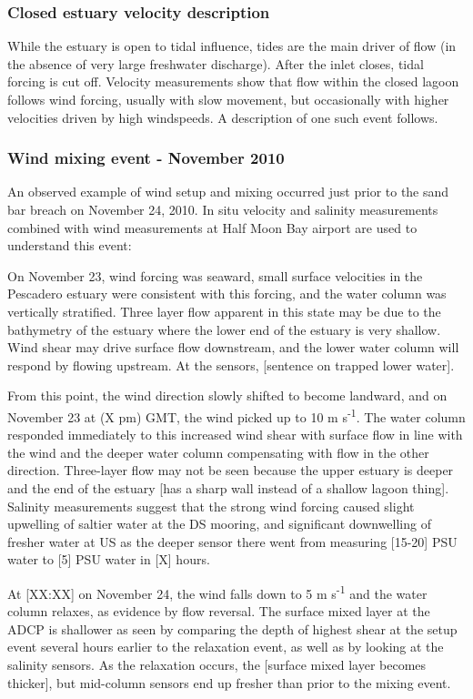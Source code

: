 \subsubsection{Closed estuary velocity description} \label{cl_vel}
While the estuary is open to tidal influence, tides are the main driver of flow (in the absence of very large freshwater discharge). After the inlet closes, tidal forcing is cut off. Velocity measurements show that flow within the closed lagoon follows wind forcing, usually with slow movement, but occasionally with higher velocities driven by high windspeeds. A description of one such event follows.


\subsubsection{Wind mixing event - November 2010} \label{sssec:WindMixNov10}
An observed example of wind setup and mixing occurred just prior to the
sand bar breach on November 24, 2010. In situ velocity and salinity
measurements combined with wind measurements at Half Moon Bay airport
are used to understand this event:

On November 23, wind forcing was seaward, small surface velocities in
the Pescadero estuary were consistent with this forcing, and the water
column was vertically stratified. Three layer flow apparent in this
state may be due to the bathymetry of the estuary where the lower end of
the estuary is very shallow. Wind shear may drive surface flow
downstream, and the lower water column will respond by flowing upstream.
At the sensors, [sentence on trapped lower water].

From this point, the wind direction slowly shifted to become landward,
and on November 23 at (X pm) GMT, the wind picked up to 10 m
s\textsuperscript{-1}. The water column responded immediately to this
increased wind shear with surface flow in line with the wind and the
deeper water column compensating with flow in the other direction.
Three-layer flow may not be seen because the upper estuary is deeper and
the end of the estuary [has a sharp wall instead of a shallow lagoon
thing]. Salinity measurements suggest that the strong wind forcing
caused slight upwelling of saltier water at the DS mooring, and
significant downwelling of fresher water at US as the deeper sensor
there went from measuring [15-20] PSU water to [5] PSU water in [X]
hours.

At [XX:XX] on November 24, the wind falls down to 5 m
s\textsuperscript{-1} and the water column relaxes, as evidence by flow
reversal. The surface mixed layer at the ADCP is shallower as seen by
comparing the depth of highest shear at the setup event several hours
earlier to the relaxation event, as well as by looking at the salinity
sensors. As the relaxation occurs, the [surface mixed layer becomes
thicker], but mid-column sensors end up fresher than prior to the mixing
event.

